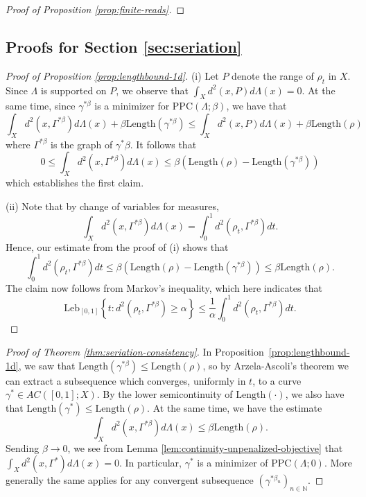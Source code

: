 \documentclass[aos, preprint]{imsart}
\theoremstyle{plain}
\theoremstyle{remark}
\begin{document}
\begin{appendix}
\begin{proof}[Proof of Proposition \ref{prop:finite-reads}]
\end{proof}

\subsection{\texorpdfstring{Proofs for Section \ref{sec:seriation}}{Proofs for Section 4}}
\label{subsec:proofs-for-seriation}
\begin{proof}[Proof of Proposition \ref{prop:lengthbound-1d}]
(i) Let $P$ denote the range of $\rho_{t}$ in $X$. Since $\Lambda$
is supported on $P$, we observe that $\int_{X}d^{2}(x,P)d\Lambda(x)=0$.
At the same time, since $\gamma^{*\beta}$ is a minimizer for $\text{PPC}(\Lambda;\beta)$,
we have that
\[
\int_{X}d^{2}(x,\Gamma^{*\beta})d\Lambda(x)+\beta\text{Length}(\gamma^{*\beta})\leq\int_{X}d^{2}(x,P)d\Lambda(x)+\beta\text{Length}(\rho)
\]
where $\Gamma^{*\beta}$ is the graph of $\gamma^*{\beta}$. It follows
that
\[
0\leq\int_{X}d^{2}(x,\Gamma^{*\beta})d\Lambda(x)\leq\beta\left(\text{Length}(\rho)-\text{Length}(\gamma^{*\beta})\right)
\]
which establishes the first claim.

(ii) Note that by change of variables for measures,
\[
\int_{X}d^{2}(x,\Gamma^{*\beta})d\Lambda(x)=\int_{0}^{1}d^{2}(\rho_{t},\Gamma^{*\beta})dt.
\]
Hence, our estimate from the proof of (i) shows that
\[
\int_{0}^{1}d^{2}(\rho_{t},\Gamma^{*\beta})dt\leq\beta\left(\text{Length}(\rho)-\text{Length}(\gamma^{*\beta})\right)\leq\beta\text{Length}(\rho).
\]
The claim now follows from Markov's inequality, which here indicates
that
\[
\text{Leb}_{[0,1]}\left\{ t:d^{2}(\rho_{t},\Gamma^{*\beta})\geq\alpha\right\} \leq\frac{1}{\alpha}\int_{0}^{1}d^{2}(\rho_{t},\Gamma^{*\beta})dt.
\]
\end{proof}

\begin{proof}[Proof of Theorem \ref{thm:seriation-consistency}]
In  Proposition~\ref{prop:lengthbound-1d}, we saw that
$\text{Length}(\gamma^{*\beta})\leq\text{Length}(\rho)$,
so by
 Arzela-Ascoli's theorem we can extract   a subsequence which converges, uniformly in $t$, to
a curve $\gamma^*\in AC([0,1];X)$.
By the lower semicontinuity of $\text{Length}(\cdot)$, we also have
that $\text{Length}(\gamma^*)\leq\text{Length}(\rho)$. At the same
time, we have the estimate
\[
\int_{X}d^{2}(x,\Gamma^{*\beta})d\Lambda(x)\leq\beta\text{Length}(\rho).
\]
Sending $\beta\rightarrow0$, we see from Lemma \ref{lem:continuity-unpenalized-objective}
that $\int_{X}d^{2}(x,\Gamma^*)d\Lambda(x)=0$.
In particular, $\gamma^*$ is a minimizer of $\text{PPC}(\Lambda;0)$.
More generally the same applies for any convergent subsequence
$(\gamma^{*\beta_{n}})_{n\in\mathbb{N}}$.


\end{proof}
\end{appendix}
\end{document}

